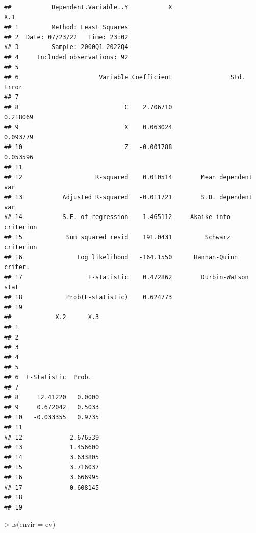 \documentclass[
]{article}
\newenvironment{Shaded}{\begin{snugshade}}{\end{snugshade}}
\newcommand{\AttributeTok}[1]{\textcolor[rgb]{0.77,0.63,0.00}{#1}}
\newcommand{\FunctionTok}[1]{\textcolor[rgb]{0.00,0.00,0.00}{#1}}
\newcommand{\NormalTok}[1]{#1}
\newcommand{\SpecialCharTok}[1]{\textcolor[rgb]{0.00,0.00,0.00}{#1}}
\begin{document}
\begin{Shaded}
\end{Shaded}

\begin{verbatim}
##           Dependent.Variable..Y           X                       X.1
## 1         Method: Least Squares                                      
## 2  Date: 07/23/22   Time: 23:02                                      
## 3         Sample: 2000Q1 2022Q4                                      
## 4     Included observations: 92                                      
## 5                                                                    
## 6                      Variable Coefficient                Std. Error
## 7                                                                    
## 8                             C    2.706710                  0.218069
## 9                             X    0.063024                  0.093779
## 10                            Z   -0.001788                  0.053596
## 11                                                                   
## 12                    R-squared    0.010514        Mean dependent var
## 13           Adjusted R-squared   -0.011721        S.D. dependent var
## 14           S.E. of regression    1.465112     Akaike info criterion
## 15            Sum squared resid    191.0431         Schwarz criterion
## 16               Log likelihood   -164.1550      Hannan-Quinn criter.
## 17                  F-statistic    0.472862        Durbin-Watson stat
## 18            Prob(F-statistic)    0.624773                          
## 19                                                                   
##            X.2      X.3
## 1                      
## 2                      
## 3                      
## 4                      
## 5                      
## 6  t-Statistic  Prob.  
## 7                      
## 8     12.41220   0.0000
## 9     0.672042   0.5033
## 10   -0.033355   0.9735
## 11                     
## 12             2.676539
## 13             1.456600
## 14             3.633805
## 15             3.716037
## 16             3.666995
## 17             0.608145
## 18                     
## 19
\end{verbatim}

\begin{Shaded}
\begin{Highlighting}[]
\SpecialCharTok{\textgreater{}} \FunctionTok{ls}\NormalTok{(}\AttributeTok{envir =}\NormalTok{ ev)}
\end{Highlighting}
\end{Shaded}
\end{document}
